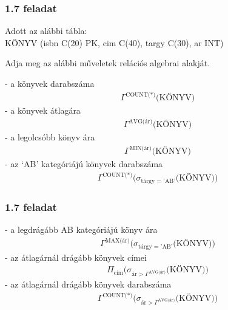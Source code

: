 \documentclass{beamer}
\title[Adatbázis rendszerek MSc gyakorlat]{}
\author[Nagy Dániel Zoltán JJ181J]{}
\begin{document}

\begin{frame}[fragile]
\frametitle{1.7 feladat}
Adott az alábbi tábla:\\
KÖNYV (isbn C(20) PK, cim C(40), targy C(30), ar INT)


Adja meg az alábbi műveletek relációs algebrai alakját.


- a könyvek darabszáma
\begin{align*}
\Gamma^{\text{COUNT(*)}}\text{(KÖNYV)}
\end{align*}
- a könyvek átlagára
\begin{align*}
\Gamma^{\text{AVG(ár)}}\text{(KÖNYV)}
\end{align*}
- a legolcsóbb könyv ára
\begin{align*}
\Gamma^{\text{MIN(ár)}}\text{(KÖNYV)}
\end{align*}
- az ‘AB’ kategóriájú könyvek darabszáma
\begin{align*}
\Gamma^{\text{COUNT(*)}}(\sigma_{\text{tárgy = 'AB'}}\text{(KÖNYV))}
\end{align*}

\end{frame}

\begin{frame}[fragile]
\frametitle{1.7 feladat}

- a legdrágább AB kategóriájú könyv ára
\begin{align*}
\Gamma^{\text{MAX(ár)}}(\sigma_{\text{tárgy = 'AB'}}\text{(KÖNYV))}
\end{align*}
- az átlagárnál drágább könyvek címei
\begin{align*}
\Pi_{\text{cím}}(\sigma_{\text{ár} > \Gamma^{\text{AVG(ár)}}}\text{(KÖNYV))}
\end{align*}
- az átlagárnál drágább könyvek darabszáma
\begin{align*}
\Gamma^{\text{COUNT(*)}}(\sigma_{\text{ár} > \Gamma^{\text{AVG(ár)}}}\text{(KÖNYV))}
\end{align*}


\end{frame}
\end{document}
